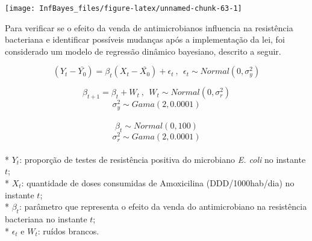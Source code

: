 \documentclass[
]{book}
\begin{document}
\begin{center}\texttt{[image: InfBayes\_files/figure-latex/unnamed-chunk-63-1]} \end{center}

Para verificar se o efeito da venda de antimicrobianos influencia na resistência
bacteriana e identificar possíveis mudanças após a implementação da lei, foi considerado um modelo de regressão dinâmico bayesiano, descrito a seguir.

\[(Y_t-\bar{Y_0}) = \beta_t (X_t-\bar{X_0}) + \epsilon_t ~,~~ \epsilon_t \sim Normal(0,\sigma_y^2)\]

\[\beta_{t+1} = \beta_t + W_t ~,~~ W_t \sim Normal(0,\sigma_r^2)\]
\[\sigma_y^2 \sim Gama(2,0.0001)\]\\
\[\beta_t \sim Normal(0,100)\]
\[\sigma_r^2 \sim Gama(2,0.0001)\]\\
* \(Y_t\): proporção de testes de resistência positiva do microbiano \emph{E. coli} no instante \(t\);\\
* \(X_t\): quantidade de doses consumidas de Amoxicilina (DDD/1000hab/dia) no instante \(t\);\\
* \(\beta_t\): parâmetro que representa o efeito da venda do antimicrobiano na resistência bacteriana no instante \(t\);\\
* \(\epsilon_t\) e \(W_t\): ruídos brancos.
\end{document}
